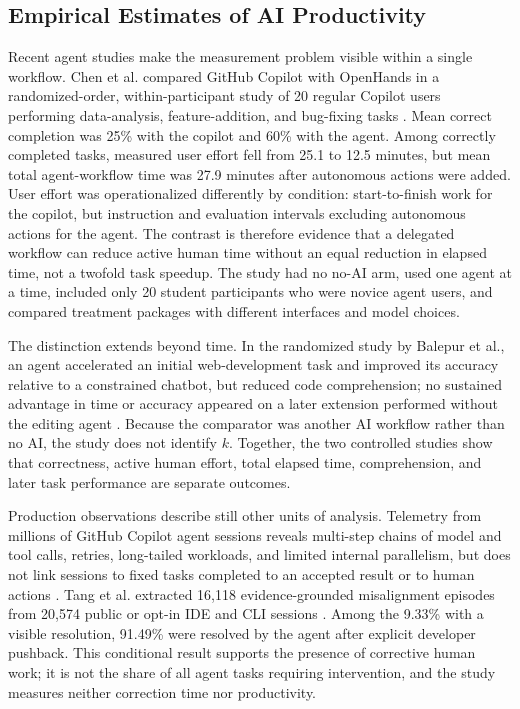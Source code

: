 \subsection{Empirical Estimates of AI Productivity}

Recent agent studies make the measurement problem visible within a single
workflow. Chen et al. compared GitHub Copilot with OpenHands in a randomized-order,
within-participant study of 20 regular Copilot users performing data-analysis,
feature-addition, and bug-fixing tasks \cite{chen2026codewithme}. Mean correct
completion was 25\% with the copilot and 60\% with the agent. Among correctly
completed tasks, measured user effort fell from 25.1 to 12.5 minutes, but mean
total agent-workflow time was 27.9 minutes after autonomous actions were added.
User effort was operationalized differently by condition: start-to-finish work
for the copilot, but instruction and evaluation intervals excluding autonomous
actions for the agent.
The contrast is therefore evidence that a delegated workflow can reduce active
human time without an equal reduction in elapsed time, not a twofold task
speedup. The study had no no-AI arm, used one agent at a time, included only 20
student participants who were novice agent users, and compared treatment
packages with different interfaces and model choices.

The distinction extends beyond time. In the randomized study by Balepur et al.,
an agent accelerated an initial web-development task and improved its accuracy
relative to a constrained chatbot, but reduced code comprehension; no sustained
advantage in time or accuracy appeared on a later extension performed without
the editing agent \cite{balepur2026impaired}. Because the comparator was another
AI workflow rather than no AI, the study does not identify $k$. Together, the
two controlled studies show that correctness, active human effort, total elapsed
time, comprehension, and later task performance are separate outcomes.

Production observations describe still other units of analysis. Telemetry from
millions of GitHub Copilot agent sessions reveals multi-step chains of model and
tool calls, retries, long-tailed workloads, and limited internal parallelism,
but does not link sessions to fixed tasks completed to an accepted result or to
human actions \cite{liu2026agenticcoding}. Tang et al. extracted 16,118
evidence-grounded misalignment episodes from 20,574 public or opt-in IDE and CLI
sessions \cite{tang2026misalignment}. Among the 9.33\% with a visible resolution,
91.49\% were resolved by the agent after explicit developer pushback. This
conditional result supports the presence of corrective human work; it is not
the share of all agent tasks requiring intervention, and the study measures
neither correction time nor productivity.

